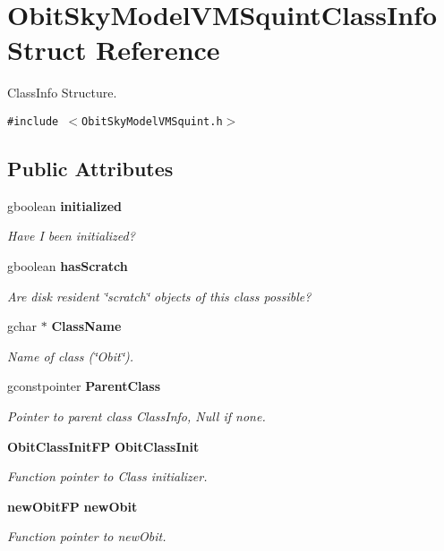 \section{Obit\-Sky\-Model\-VMSquint\-Class\-Info Struct Reference}
\label{structObitSkyModelVMSquintClassInfo}
Class\-Info Structure.  


{\tt \#include $<$Obit\-Sky\-Model\-VMSquint.h$>$}

\subsection*{Public Attributes}
\begin{CompactItemize}
\item 
gboolean {\bf initialized}
\begin{CompactList}\small\item\em Have I been initialized? \item\end{CompactList}\item 
gboolean {\bf has\-Scratch}
\begin{CompactList}\small\item\em Are disk resident \char`\"{}scratch\char`\"{} objects of this class possible? \item\end{CompactList}\item 
gchar $\ast$ {\bf Class\-Name}
\begin{CompactList}\small\item\em Name of class (\char`\"{}Obit\char`\"{}). \item\end{CompactList}\item 
gconstpointer {\bf Parent\-Class}
\begin{CompactList}\small\item\em Pointer to parent class Class\-Info, Null if none. \item\end{CompactList}\item 
{\bf Obit\-Class\-Init\-FP} {\bf Obit\-Class\-Init}
\begin{CompactList}\small\item\em Function pointer to Class initializer. \item\end{CompactList}\item 
{\bf new\-Obit\-FP} {\bf new\-Obit}
\begin{CompactList}\small\item\em Function pointer to new\-Obit. \item\end{CompactList}\item 

\end{CompactItemize}
